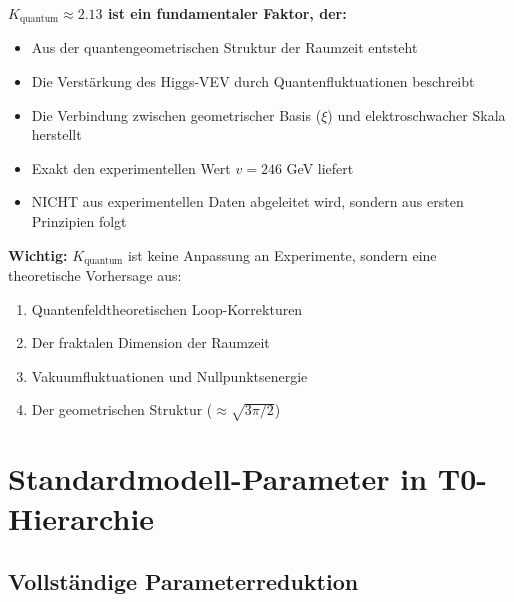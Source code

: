 \documentclass[12pt,a4paper]{article}
\begin{document}
	\begin{tcolorbox}[colback=yellow!10!white,colframe=red!75!black,title=Schlüsselergebnis]
		\textbf{$K_{\text{quantum}} \approx 2.13$ ist ein fundamentaler Faktor, der:}
		\begin{itemize}
			\item Aus der quantengeometrischen Struktur der Raumzeit entsteht
			\item Die Verstärkung des Higgs-VEV durch Quantenfluktuationen beschreibt
			\item Die Verbindung zwischen geometrischer Basis ($\xi$) und elektroschwacher Skala herstellt
			\item Exakt den experimentellen Wert $v = 246$ GeV liefert
			\item NICHT aus experimentellen Daten abgeleitet wird, sondern aus ersten Prinzipien folgt
		\end{itemize}
		
		\textbf{Wichtig:} $K_{\text{quantum}}$ ist keine Anpassung an Experimente, sondern eine theoretische Vorhersage aus:
		\begin{enumerate}
			\item Quantenfeldtheoretischen Loop-Korrekturen
			\item Der fraktalen Dimension der Raumzeit
			\item Vakuumfluktuationen und Nullpunktsenergie
			\item Der geometrischen Struktur ($\approx \sqrt{3\pi/2}$)
		\end{enumerate}
	\end{tcolorbox}
	
	\section{Standardmodell-Parameter in T0-Hierarchie}
	
	\subsection{Vollständige Parameterreduktion}
	
\end{document}
